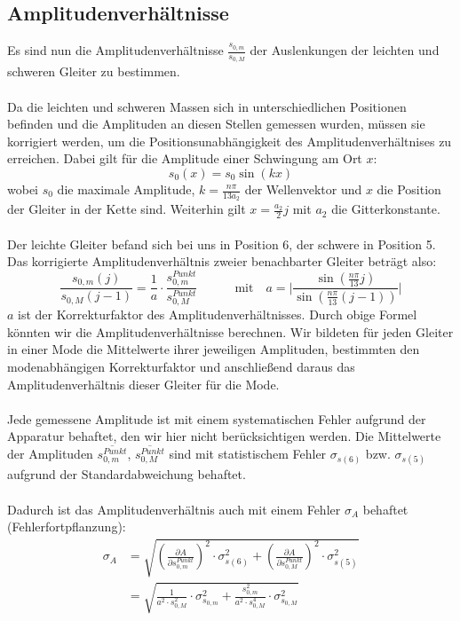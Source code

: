 \documentclass[a4paper,titlepage]{scrartcl}
\numberwithin{equation}{section}
\begin{document}
\subsection{Amplitudenverhältnisse}
Es sind nun die Amplitudenverhältnisse $\frac{s_{0,m}}{s_{0,M}}$ der Auslenkungen der leichten und schweren Gleiter zu bestimmen.\\ \\
Da die leichten und schweren Massen sich in unterschiedlichen Positionen befinden und die Amplituden an diesen Stellen gemessen wurden, müssen sie korrigiert werden, um die Positionsunabhängigkeit des Amplitudenverhältnises zu erreichen. Dabei gilt für die Amplitude einer Schwingung am Ort $x$:
\begin{equation*}
s_0(x)=s_0 \sin{(kx)}
\end{equation*}
wobei $s_0$ die maximale Amplitude, $k=\frac{n \pi}{13 a_2}$ der Wellenvektor und $x$ die Position der Gleiter in der Kette sind. Weiterhin gilt $x=\frac{a_2}{2} j$ mit $a_2$ die Gitterkonstante.\\ \\
Der leichte Gleiter befand sich bei uns in Position 6, der schwere in Position 5. Das korrigierte Amplitudenverhältnis zweier benachbarter Gleiter beträgt also:
\begin{equation*}
\frac{s_{0,m}(j)}{s_{0,M}(j-1)}=\frac{1}{a} \cdot \frac{s_{0,m}^{Punkt}}{s_{0,M}^{Punkt}} \quad \quad \quad \text{mit} \quad a=\bigg| \frac{\sin{\left( \frac{n \pi}{13} j \right)}}{\sin{ \left( \frac{n \pi}{13} (j-1) \right) }} \bigg|
\end{equation*}
$a$ ist der Korrekturfaktor des Amplitudenverhältnisses. Durch obige Formel könnten wir die Amplitudenverhältnisse berechnen. Wir bildeten für jeden Gleiter in einer Mode die Mittelwerte ihrer jeweiligen Amplituden, bestimmten den modenabhängigen Korrekturfaktor und anschließend daraus das Amplitudenverhältnis dieser Gleiter für die Mode.\\ \\
Jede gemessene Amplitude ist mit einem systematischen Fehler aufgrund der Apparatur behaftet, den wir hier nicht berücksichtigen werden. Die Mittelwerte der Amplituden $\overline{s_{0,m}^{Punkt}}$, $\overline{s_{0,M}^{Punkt}}$ sind mit statistischem Fehler $\sigma_{s(6)}$ bzw. $\sigma_{s(5)}$ aufgrund der Standardabweichung behaftet.\\ \\
Dadurch ist das Amplitudenverhältnis auch mit einem Fehler $\sigma_A$ behaftet (Fehlerfortpflanzung):
\begin{align*}
\sigma_A&=\sqrt{\left( \frac{\partial A}{\partial s_{0,m}^{Punkt}} \right)^2 \cdot \sigma^2_{s(6)} + \left( \frac{\partial A}{\partial s_{0,M}^{Punkt}} \right)^2 \cdot \sigma^2_{s(5)}}\\
&=\sqrt{\frac{1}{a^2 \cdot s_{0,M}^2} \cdot \sigma^2_{s_{0,m}} + \frac{s_{0,m}^2}{a^2 \cdot s^4_{0,M}} \cdot \sigma^2_{s_{0,M}}}
\end{align*}
\end{document}
